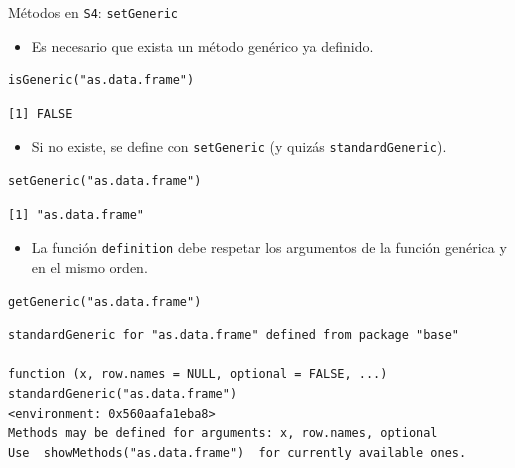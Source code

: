 \documentclass[xcolor={usenames,svgnames,dvipsnames}]{beamer}
\begin{document}
\begin{frame}[label={sec:org2ee3dc0},fragile]{Métodos en \texttt{S4}: \texttt{setGeneric}}
 \begin{itemize}
\item Es necesario que exista un método genérico ya definido.
\end{itemize}
\lstset{language=r,label= ,caption= ,captionpos=b,numbers=none}
\begin{lstlisting}
isGeneric("as.data.frame")
\end{lstlisting}

\begin{verbatim}
[1] FALSE
\end{verbatim}


\begin{itemize}
\item Si no existe, se define con \texttt{setGeneric} (y quizás \texttt{standardGeneric}).
\end{itemize}
\lstset{language=r,label= ,caption= ,captionpos=b,numbers=none}
\begin{lstlisting}
setGeneric("as.data.frame")
\end{lstlisting}

\begin{verbatim}
[1] "as.data.frame"
\end{verbatim}


\begin{itemize}
\item La función \texttt{definition} debe respetar los argumentos de la función genérica y en el mismo orden.
\end{itemize}
\lstset{language=r,label= ,caption= ,captionpos=b,numbers=none}
\begin{lstlisting}
getGeneric("as.data.frame")
\end{lstlisting}

\begin{verbatim}
standardGeneric for "as.data.frame" defined from package "base"

function (x, row.names = NULL, optional = FALSE, ...) 
standardGeneric("as.data.frame")
<environment: 0x560aafa1eba8>
Methods may be defined for arguments: x, row.names, optional
Use  showMethods("as.data.frame")  for currently available ones.
\end{verbatim}
\end{frame}
\end{document}
